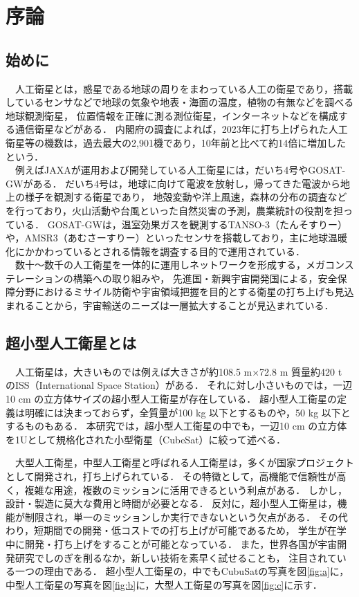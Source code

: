 \section{序論}
\subsection{始めに}
　人工衛星とは，惑星である地球の周りをまわっている人工の衛星であり，搭載しているセンサなどで地球の気象や地表・海面の温度，植物の有無などを調べる地球観測衛星，
位置情報を正確に測る測位衛星，インターネットなどを構成する通信衛星などがある．
内閣府の調査によれば，2023年に打ち上げられた人工衛星等の機数は，過去最大の2,901機であり，10年前と比べて約14倍に増加したという\cite{intro1}．\\
　例えばJAXAが運用および開発している人工衛星には，だいち4号やGOSAT-GWがある．
だいち4号は，地球に向けて電波を放射し，帰ってきた電波から地上の様子を観測する衛星であり，
地殻変動や洋上風速，森林の分布の調査などを行っており，火山活動や台風といった自然災害の予測，農業統計の役割を担っている．
GOSAT-GWは，温室効果ガスを観測するTANSO-3（たんそすりー）や，AMSR3（あむさーすりー）といったセンサを搭載しており，主に地球温暖化にかかわっているとされる情報を調査する目的で運用されている\cite{sat}．\\
　数十～数千の人工衛星を一体的に運用しネットワークを形成する，メガコンステレーションの構築への取り組みや，
先進国・新興宇宙開発国による，安全保障分野におけるミサイル防衛や宇宙領域把握を目的とする衛星の打ち上げも見込まれることから，宇宙輸送のニーズは一層拡大することが見込まれている．


\subsection{超小型人工衛星とは}
　人工衛星は，大きいものでは例えば大きさが約108.5 m×72.8 m 質量約420 t のISS（International Space Station）がある\cite{intro2}．
それに対し小さいものでは，一辺10 cm の立方体サイズの超小型人工衛星が存在している．
超小型人工衛星の定義は明確には決まっておらず，全質量が100 kg 以下とするものや，50 kg 以下とするものもある．
本研究では，超小型人工衛星の中でも，一辺10 cm の立方体を1Uとして規格化された小型衛星（CubeSat）に絞って述べる．

　大型人工衛星，中型人工衛星と呼ばれる人工衛星は，多くが国家プロジェクトとして開発され，打ち上げられている．
その特徴として，高機能で信頼性が高く，複雑な用途，複数のミッションに活用できるという利点がある．
しかし，設計・製造に莫大な費用と時間が必要となる．
反対に，超小型人工衛星は，機能が制限され，単一のミッションしか実行できないという欠点がある．
その代わり，短期間での開発・低コストでの打ち上げが可能であるため，
学生が在学中に開発・打ち上げをすることが可能となっている．
また，世界各国が宇宙開発研究でしのぎを削るなか，新しい技術を素早く試せることも，
注目されている一つの理由である．
超小型人工衛星の，中でもCubuSatの写真を図\ref{fig:a}\cite{micro}に，中型人工衛星の写真を図\ref{fig:b}\cite{medium}に，大型人工衛星の写真を図\ref{fig:c}\cite{large}に示す．


